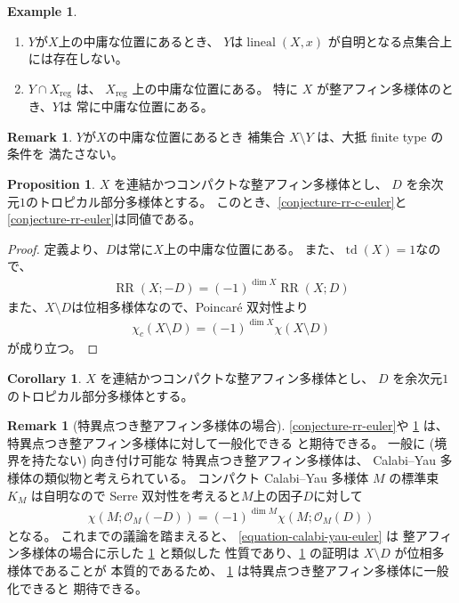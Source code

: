 \documentclass[a4paper,dvipdfmx,reqno,12pt]{amsart}
\theoremstyle{definition}
\newtheorem{example}[theorem]{Example}
\newtheorem{proposition}[theorem]{Proposition}
\newtheorem{corollary}[theorem]{Corollary}
\newtheorem{remark}[theorem]{Remark}
\newcommand{\opn}[1]{\operatorname{#1}}
\numberwithin{equation}{section}
\begin{document}
\begin{example}
\begin{enumerate}
\item $Y$が$X$上の中庸な位置にあるとき、
$Y$は$\opn{lineal}(X,x)$
が自明となる点集合上には存在しない。
\item $Y\cap X_{\mathrm{reg}}$ は、
$X_{\mathrm{reg}}$ 上の中庸な位置にある。
特に $X$ が整アフィン多様体のとき、$Y$は
常に中庸な位置にある。
\end{enumerate}

\end{example}

\begin{remark}
$Y$が$X$の中庸な位置にあるとき
補集合 $X\setminus Y$ は、大抵 finite type の条件を
満たさない。
\end{remark}

\begin{proposition}
\label{proposition-divisor-poincare}
$X$ を連結かつコンパクトな整アフィン多様体とし、
$D$ を余次元$1$のトロピカル部分多様体とする。
このとき、\cref{conjecture-rr-c-euler}と
\cref{conjecture-rr-euler}は同値である。
\end{proposition}
\begin{proof}
定義より、$D$は常に$X$上の中庸な位置にある。
また、$\opn{td}(X)=1$なので、
\begin{align}
\opn{RR}(X;-D)=(-1)^{\dim X}\opn{RR}(X;D)
\end{align}
また、$X\setminus D$は位相多様体なので、Poincar\'e 双対性より
\begin{align}
\chi_c(X\setminus D)=(-1)^{\dim X}\chi(X\setminus D)
\end{align}
が成り立つ。
\end{proof}

\begin{corollary}
$X$ を連結かつコンパクトな整アフィン多様体とし、
$D$ を余次元$1$のトロピカル部分多様体とする。	
\end{corollary}

\begin{remark}[{特異点つき整アフィン多様体の場合}]
\label{remark-iass}
\cref{conjecture-rr-euler}や
\cref{proposition-divisor-poincare}
は、特異点つき整アフィン多様体に対して一般化できる
と期待できる。
一般に (境界を持たない) 向き付け可能な
特異点つき整アフィン多様体は、
Calabi--Yau 多様体の類似物と考えられている。
コンパクト Calabi--Yau 多様体 $M$ の標準束
$K_M$ は自明なので
Serre 双対性を考えると$M$上の因子$D$に対して
\begin{align}
\label{equation-calabi-yau-euler}
\chi(M;\mathcal{O}_M(-D))=(-1)^{\dim M}
\chi(M;\mathcal{O}_{M}(D))
\end{align}
となる。
これまでの議論を踏まえると、
\cref{equation-calabi-yau-euler} は
整アフィン多様体の場合に示した
\cref{proposition-divisor-poincare} と類似した
性質であり、\cref{proposition-divisor-poincare}
の証明は $X\setminus D$ が位相多様体であることが
本質的であるため、
\cref{proposition-divisor-poincare}
は特異点つき整アフィン多様体に一般化できると
期待できる。
\end{remark}
\end{document}
